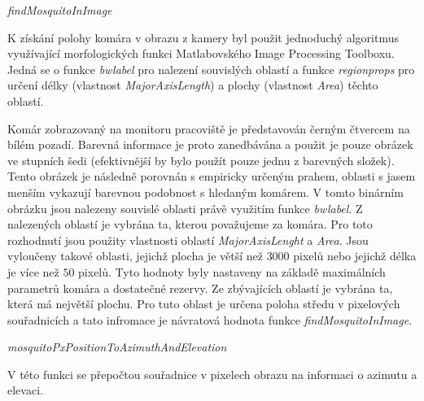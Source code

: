 \documentclass[a4paper,10pt]{article}
\begin{document}
\vspace{0.5cm}
\textit{findMosquitoInImage}

K získání polohy komára v obrazu z kamery byl použit jednoduchý algoritmus využívající morfologických funkci Matlabovského Image Processing Toolboxu. Jedná se o funkce \textit{bwlabel} pro nalezení souvislých oblastí a funkce \textit{regionprops} pro určení délky (vlastnost \textit{MajorAxisLength}) a plochy (vlastnost \textit{Area}) těchto oblastí.

Komár zobrazovaný na monitoru pracoviště je představován černým čtvercem na bílém pozadí. Barevná informace je proto zanedbávána a použit je pouze obrázek ve stupních šedi (efektivnější by bylo použít pouze jednu z barevných složek). Tento obrázek je následně porovnán s empiricky určeným prahem, oblasti s jasem menším vykazují barevnou podobnost s hledaným komárem. V tomto binárním obrázku jsou nalezeny souvislé oblasti právě využitím funkce \textit{bwlabel}. Z nalezených oblastí je vybrána ta, kterou považujeme za komára. Pro toto rozhodnutí jsou použity vlastnosti oblastí \textit{MajorAxisLenght} a \textit{Area}. Jsou vyloučeny takové oblasti, jejichž plocha je větší než $3000$ pixelů nebo jejichž délka je více než $50$ pixelů. Tyto hodnoty byly nastaveny na základě maximálních parametrů komára a dostatečné rezervy. Ze zbývajících oblastí je vybrána ta, která má největší plochu. Pro tuto oblast je určena poloha středu v pixelových souřadnicích a tato infromace je návratová hodnota funkce \textit{findMosquitoInImage}.


\vspace{0.5cm}
\textit{mosquitoPxPositionToAzimuthAndElevation}

V této funkci se přepočtou souřadnice v pixelech obrazu na informaci o azimutu a elevaci.
\end{document}
